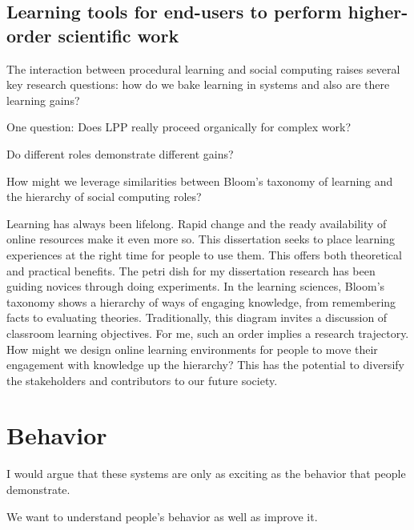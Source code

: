 \subsection{Learning tools for end-users to perform higher-order scientific work}
The interaction between procedural learning and social computing raises several key research questions: how do we bake learning in systems and also are there learning gains?

One question: Does LPP really proceed organically for complex work?

Do different roles demonstrate different gains?

How might we leverage similarities between Bloom’s taxonomy of learning and the hierarchy of social computing roles?

Learning has always been lifelong. Rapid change and the ready availability of online resources make it even more so. This dissertation seeks to place learning experiences at the right time for people to use them. This offers both theoretical and practical benefits. The petri dish for my dissertation research has been guiding novices through doing experiments. In the learning sciences, Bloom’s taxonomy shows a hierarchy of ways of engaging knowledge, from remembering facts to evaluating theories. Traditionally, this diagram invites a discussion of classroom learning objectives. For me, such an order implies a research trajectory. How might we design online learning environments for people to move their engagement with knowledge up the hierarchy? This has the potential to diversify the stakeholders and contributors to our future society. 




\section{Behavior} 

I would argue that these systems are only as exciting as the behavior that people demonstrate. 

We want to understand people's behavior as well as improve it. 

